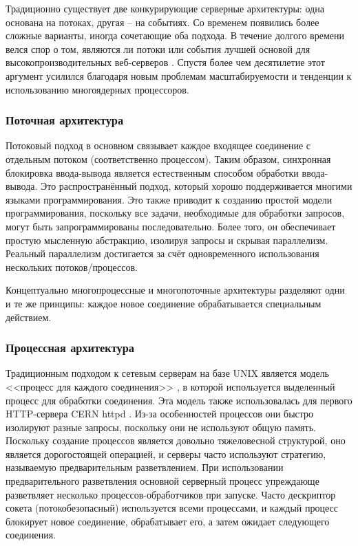 Традиционно существует две конкурирующие серверные архитектуры: одна основана на потоках, другая -- на событиях. Со временем появились более сложные варианты, иногда сочетающие оба подхода. В течение долгого времени велся спор о том, являются ли потоки или события лучшей основой для высокопроизводительных веб-серверов \cite{monadic}. Спустя более чем десятилетие этот аргумент усилился благодаря новым проблемам масштабируемости и тенденции к использованию многоядерных процессоров.

\subsubsection{Поточная архитектура}

Потоковый подход в основном связывает каждое входящее соединение с отдельным потоком (соответственно процессом). Таким образом, синхронная блокировка ввода-вывода является естественным способом обработки ввода-вывода. Это распространённый подход, который хорошо поддерживается многими языками программирования. Это также приводит к созданию простой модели программирования, поскольку все задачи, необходимые для обработки запросов, могут быть запрограммированы последовательно. Более того, он обеспечивает простую мысленную абстракцию, изолируя запросы и скрывая параллелизм. Реальный параллелизм достигается за счёт одновременного использования нескольких потоков/процессов.

Концептуально многопроцессные и многопоточные архитектуры разделяют одни и те же принципы: каждое новое соединение обрабатывается специальным действием.

\subsubsection{Процессная архитектура}

Традиционным подходом к сетевым серверам на базе UNIX является модель <<процесс для каждого соединения>> \cite{unix-prog}, в которой используется выделенный процесс для обработки соединения. Эта модель также использовалась для первого HTTP-сервера CERN httpd \cite{w3daemon}. Из-за особенностей процессов они быстро изолируют разные запросы, поскольку они не используют общую память. Поскольку создание процессов является довольно тяжеловесной структурой, оно является дорогостоящей операцией, и серверы часто используют стратегию, называемую предварительным разветвлением. При использовании предварительного разветвления основной серверный процесс упреждающе разветвляет несколько процессов-обработчиков при запуске. Часто дескриптор сокета (потокобезопасный) используется всеми процессами, и каждый процесс блокирует новое соединение, обрабатывает его, а затем ожидает следующего соединения.

